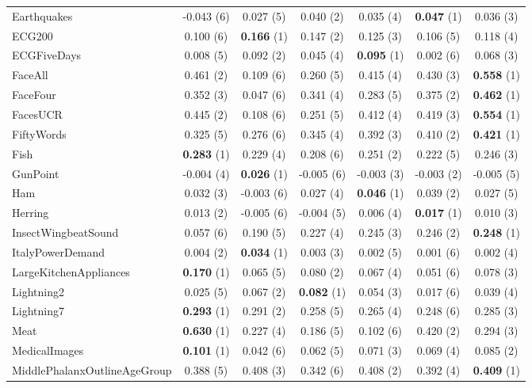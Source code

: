 \begin{table}[ht]
\begin{adjustbox}{width=\textwidth}
\begin{tabular}{lcccccc}
    Earthquakes & -0.043 (6) & 0.027 (5) & 0.040 (2) & 0.035 (4) & \textbf{0.047} (1) & 0.036 (3) \\
    ECG200 & 0.100 (6) & \textbf{0.166} (1) & 0.147 (2) & 0.125 (3) & 0.106 (5) & 0.118 (4) \\
    ECGFiveDays & 0.008 (5) & 0.092 (2) & 0.045 (4) & \textbf{0.095} (1) & 0.002 (6) & 0.068 (3) \\
    FaceAll & 0.461 (2) & 0.109 (6) & 0.260 (5) & 0.415 (4) & 0.430 (3) & \textbf{0.558} (1) \\
    FaceFour & 0.352 (3) & 0.047 (6) & 0.341 (4) & 0.283 (5) & 0.375 (2) & \textbf{0.462} (1) \\
    FacesUCR & 0.445 (2) & 0.108 (6) & 0.251 (5) & 0.412 (4) & 0.419 (3) & \textbf{0.554} (1) \\
    FiftyWords & 0.325 (5) & 0.276 (6) & 0.345 (4) & 0.392 (3) & 0.410 (2) & \textbf{0.421} (1) \\
    Fish & \textbf{0.283} (1) & 0.229 (4) & 0.208 (6) & 0.251 (2) & 0.222 (5) & 0.246 (3) \\
    GunPoint & -0.004 (4) & \textbf{0.026} (1) & -0.005 (6) & -0.003 (3) & -0.003 (2) & -0.005 (5) \\
    Ham & 0.032 (3) & -0.003 (6) & 0.027 (4) & \textbf{0.046} (1) & 0.039 (2) & 0.027 (5) \\
    Herring & 0.013 (2) & -0.005 (6) & -0.004 (5) & 0.006 (4) & \textbf{0.017} (1) & 0.010 (3) \\
    InsectWingbeatSound & 0.057 (6) & 0.190 (5) & 0.227 (4) & 0.245 (3) & 0.246 (2) & \textbf{0.248} (1) \\
    ItalyPowerDemand & 0.004 (2) & \textbf{0.034} (1) & 0.003 (3) & 0.002 (5) & 0.001 (6) & 0.002 (4) \\
    LargeKitchenAppliances & \textbf{0.170} (1) & 0.065 (5) & 0.080 (2) & 0.067 (4) & 0.051 (6) & 0.078 (3) \\
    Lightning2 & 0.025 (5) & 0.067 (2) & \textbf{0.082} (1) & 0.054 (3) & 0.017 (6) & 0.039 (4) \\
    Lightning7 & \textbf{0.293} (1) & 0.291 (2) & 0.258 (5) & 0.265 (4) & 0.248 (6) & 0.285 (3) \\
    Meat & \textbf{0.630} (1) & 0.227 (4) & 0.186 (5) & 0.102 (6) & 0.420 (2) & 0.294 (3) \\
    MedicalImages & \textbf{0.101} (1) & 0.042 (6) & 0.062 (5) & 0.071 (3) & 0.069 (4) & 0.085 (2) \\
    MiddlePhalanxOutlineAgeGroup & 0.388 (5) & 0.408 (3) & 0.342 (6) & 0.408 (2) & 0.392 (4) & \textbf{0.409} (1) \\

\end{tabular}
\end{adjustbox}
\end{table}
